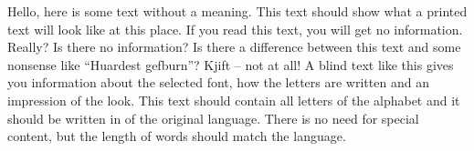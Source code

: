\thispagestyle{plain}                %

\vspace{3ex}
\blindtext

\vspace{3cm}
\vspace{3ex}
Hello, here is some text without a meaning. This text should show what a printed text will look like at this place. If you read this text, you will get no information. Really? Is there no information? Is there a difference between this text and some nonsense like “Huardest gefburn”? Kjift – not at all! A blind text like this gives you information about the selected font, how the letters are written and an impression of the look. This text should contain all letters of the alphabet and it should be written in of the original language. There is no need for special content, but the length of words should match the language.